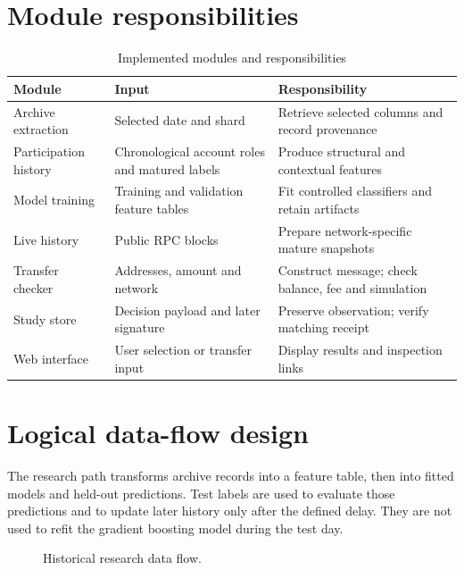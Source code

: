 \documentclass[12pt,a4paper,oneside]{report}
\begin{document}
\section{Module responsibilities}
\begin{table}[htbp]\centering\caption{Implemented modules and responsibilities}
\small\begin{tabularx}{\textwidth}{p{36mm}YY}\toprule Module&Input&Responsibility\\\midrule
Archive extraction&Selected date and shard&Retrieve selected columns and record provenance\\
Participation history&Chronological account roles and matured labels&Produce structural and contextual features\\
Model training&Training and validation feature tables&Fit controlled classifiers and retain artifacts\\
Live history&Public RPC blocks&Prepare network-specific mature snapshots\\
Transfer checker&Addresses, amount and network&Construct message; check balance, fee and simulation\\
Study store&Decision payload and later signature&Preserve observation; verify matching receipt\\
Web interface&User selection or transfer input&Display results and inspection links\\\bottomrule\end{tabularx}\end{table}
\section{Logical data-flow design}
The research path transforms archive records into a feature table, then into fitted models and held-out predictions. Test labels are used to evaluate those predictions and to update later history only after the defined delay. They are not used to refit the gradient boosting model during the test day.
\begin{figure}[htbp]\centering
{}\caption{Historical research data flow.}\end{figure}
\clearpage
\end{document}
